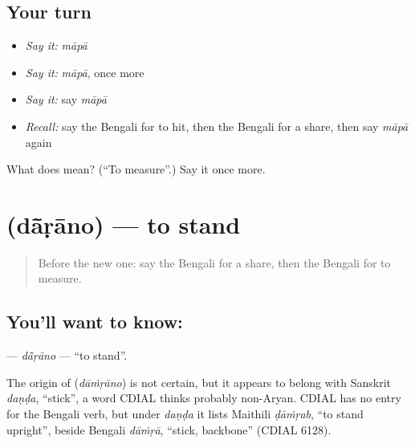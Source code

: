 \subsection*{Your turn}
\begin{itemize}
\raggedright
  \item \emph{Say it:} \emph{māpā}
  \item \emph{Say it:} \emph{māpā}, once more
  \item \emph{Say it:} say \emph{māpā}
  \item \emph{Recall:} say the Bengali for to hit, then the Bengali for a share, then say \emph{māpā} again
\end{itemize}

\begin{tcolorbox}[breakable,colback=teal!4,colframe=teal!35!black,title={Before you move on}]
What does  mean? (\textquotedblleft{}To measure\textquotedblright{}.) Say it once more.
\end{tcolorbox}
\section[\texorpdfstring{\bn{দাঁড়ানো} (dā̃ṛāno)}{দাঁড়ানো (dā̃ṛāno)}]{ (dā̃ṛāno) — to stand}

\label{lesson:BN-C104-darano}



\begin{quote}
Before the new one: say the Bengali for a share, then the Bengali for to measure.
\end{quote}

\subsection*{You'll want to know: }
\textbf{} — \emph{dā̃ṛāno} — \textquotedblleft{}to stand\textquotedblright{}.

\begin{cousinweb}
The origin of \textbf{} (\emph{dāṁṛāno}) is not certain, but it appears to belong with Sanskrit \emph{daṇḍa}, \textquotedblleft{}stick\textquotedblright{}, a word CDIAL thinks probably non-Aryan. CDIAL has no entry for the Bengali verb, but under \emph{daṇḍa} it lists Maithili \emph{ḍāṁṛab}, \textquotedblleft{}to stand upright\textquotedblright{}, beside Bengali \emph{dāṁṛā}, \textquotedblleft{}stick, backbone\textquotedblright{} (CDIAL 6128).
\end{cousinweb}

